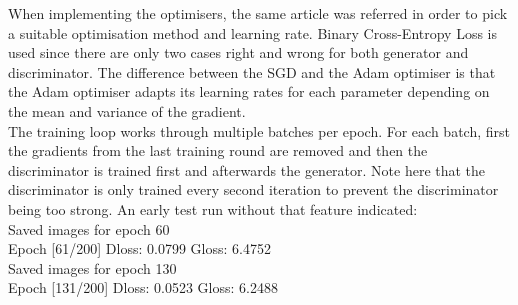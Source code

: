 When implementing the optimisers, the same article\cite{brownlee_tips_2019} was referred in order to pick a suitable optimisation method and learning rate. Binary Cross-Entropy Loss is used since there are only two cases right and wrong for both generator and discriminator. The difference between the SGD and the Adam optimiser is that the Adam optimiser adapts its learning rates for each parameter depending  on the mean and variance of the gradient. \\
The training loop works through multiple batches per epoch. For each batch, first the gradients from the last training round are removed and then the discriminator is trained first and afterwards the generator. Note here that the discriminator is only trained every second iteration to prevent the discriminator being too strong. An early test run without that feature indicated: \\
\newline 
Saved images for epoch 60\\
Epoch [61/200] Dloss: 0.0799 Gloss: 6.4752\\
Saved images for epoch 130\\
Epoch [131/200] Dloss: 0.0523 Gloss: 6.2488\\

